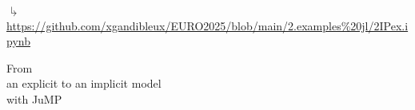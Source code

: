 \documentclass[]{beamer}
\begin{document}
\begin{frame}
\vspace{1mm}
 \hspace{5mm}$\drsh$ {\tiny \url{https://github.com/xgandibleux/EURO2025/blob/main/2.examples\%20jl/2IPex.ipynb}}
\end{frame}



% 
%
\begin{frame}

\begin{center} 
\Large{From \\ an explicit to an implicit model \\ with JuMP}
\end{center}
              
\end{frame}

% 
%
\end{document}
